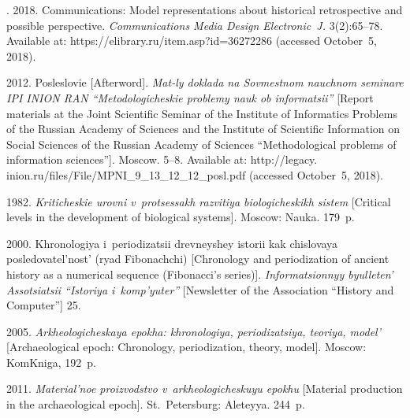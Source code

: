 \begin{multicols}{2}
{{\begin{thebibliography}{99}
. 2018.  Communications: Model 
representations about historical retrospective and possible perspective. 
\textit{Communications Media Design Electronic~J.}  3(2):65--78. 
Available at: {\sf https://elibrary.ru/item.asp?id=36272286} (accessed October~5, 
2018).

\vspace*{1pt}

 2012. Posleslovie [Afterword]. \textit{Mat-ly doklada 
na Sovmestnom nauchnom seminare IPI \mbox{INION} RAN ``Metodologicheskie 
problemy nauk ob informatsii''}  [Report materials at the Joint Scientific 
Seminar of the Institute of Informatics Problems of the Russian Academy of 
Sciences and the Institute of Scientific Information on Social Sciences of the 
Russian Academy of Sciences ``Methodological problems of information 
sciences''].  Moscow. 5--8.  Available at: {\sf 
http://legacy. inion.ru/files/File/MPNI\_9\_13\_12\_12\_posl.pdf} (accessed 
October~5, 2018).

\vspace*{1pt}

 1982. \textit{Kriticheskie urovni 
v~protsessakh razvitiya biologicheskikh sistem} [Critical levels in the development 
of biological systems]. Moscow: Nauka. 179~p.

\vspace*{1pt}

 2000. Khronologiya i~periodizatsii drev\-ney\-shey istorii 
kak chislovaya posledovatel'nost' (ryad Fibonachchi) [Chronology and 
periodization of ancient history as a numerical sequence (Fibonacci's series)]. 
\textit{Informatsionnyy byulleten' Assotsiatsii ``Istoriya i~komp'yuter''} 
[Newsletter of the Association ``History and Computer'']  25.

\vspace*{1pt}

 2005. \textit{Arkheologicheskaya epokha: khro\-no\-lo\-giya, 
periodizatsiya, teoriya, model'} [Archaeological epoch: Chronology, periodization, 
theory, model]. Moscow: KomKniga, 192~p.

\vspace*{1pt}

 2011. \textit{Material'noe proizvodstvo 
v~arkheologicheskuyu epokhu} [Material production in the archaeological epoch]. 
St.\ Petersburg: Aleteyya. 244~p.


\end{thebibliography}}}
\end{multicols}
